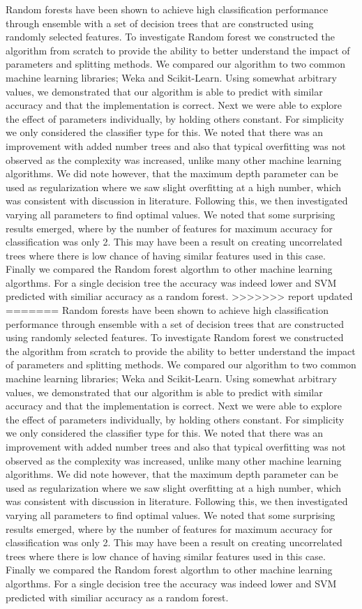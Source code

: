 \documentclass{article} %
\begin{document}
Random forests have been shown to achieve high classification performance through ensemble with a set of decision trees that are constructed using randomly selected features. To investigate Random forest we constructed the algorithm from scratch to provide the ability to better understand the impact of parameters and splitting methods. We compared our algorithm to two common machine learning libraries; Weka and Scikit-Learn. Using somewhat arbitrary values, we demonstrated that our algorithm is able to predict with similar accuracy and that the implementation is correct. Next we were able to explore the effect of parameters individually, by holding others constant. For simplicity we only considered the classifier type for this. We noted that there was an improvement with added number trees and also that typical overfitting was not observed as the complexity was increased, unlike many other machine learning algorithms. We did note however, that the maximum depth parameter can be used as regularization where we saw slight overfitting at a high number, which was consistent with discussion in literature. Following this, we then investigated varying all parameters to find optimal values. We noted that some surprising results emerged, where by the number of features for maximum accuracy for classification was only 2. This may have been a result on creating uncorrelated trees where there is low chance of having similar features used in this case. Finally we compared the Random forest algorthm to other machine learning algorthms. For a single decision tree the accuracy was indeed lower and SVM predicted with similiar accuracy as a random forest.
>>>>>>> report updated
=======
Random forests have been shown to achieve high classification performance through ensemble with a set of decision trees that are constructed using randomly selected features. To investigate Random forest we constructed the algorithm from scratch to provide the ability to better understand the impact of parameters and splitting methods. We compared our algorithm to two common machine learning libraries; Weka and Scikit-Learn. Using somewhat arbitrary values, we demonstrated that our algorithm is able to predict with similar accuracy and that the implementation is correct. Next we were able to explore the effect of parameters individually, by holding others constant. For simplicity we only considered the classifier type for this. We noted that there was an improvement with added number trees and also that typical overfitting was not observed as the complexity was increased, unlike many other machine learning algorithms. We did note however, that the maximum depth parameter can be used as regularization where we saw slight overfitting at a high number, which was consistent with discussion in literature. Following this, we then investigated varying all parameters to find optimal values. We noted that some surprising results emerged, where by the number of features for maximum accuracy for classification was only 2. This may have been a result on creating uncorrelated trees where there is low chance of having similar features used in this case. Finally we compared the Random forest algorthm to other machine learning algorthms. For a single decision tree the accuracy was indeed lower and SVM predicted with similiar accuracy as a random forest.
\end{document}
